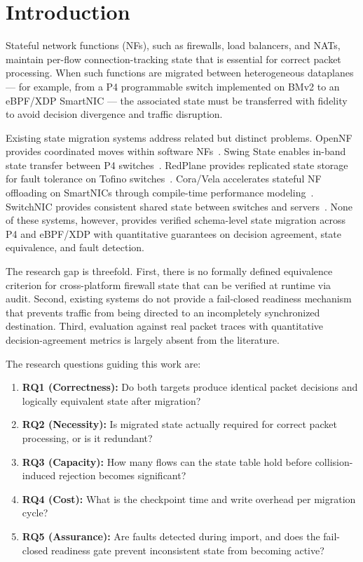 \documentclass[10pt, conference, compsoc]{IEEEtran}
\begin{document}
\section{Introduction}
\label{sec:introduction}

Stateful network functions (NFs), such as firewalls, load balancers, and NATs,
maintain per-flow connection-tracking state that is essential for correct packet
processing. When such functions are migrated between heterogeneous dataplanes
--- for example, from a P4 programmable switch implemented on BMv2 to an
eBPF/XDP SmartNIC --- the associated state must be transferred with fidelity to
avoid decision divergence and traffic disruption.

Existing state migration systems address related but distinct problems. OpenNF
provides coordinated moves within software NFs~\cite{gember2014opennf}.
Swing State enables in-band state transfer between P4 switches~\cite{luo2017swing}.
RedPlane provides replicated state storage for fault tolerance on Tofino
switches~\cite{kim2021redplane}. Cora/Vela accelerates stateful NF offloading on
SmartNICs through compile-time performance modeling~\cite{xi2024cora}. SwitchNIC
provides consistent shared state between switches and servers~\cite{lei2025switchnic}.
None of these systems, however, provides verified schema-level state migration
across P4 and eBPF/XDP with quantitative guarantees on decision agreement,
state equivalence, and fault detection.

The research gap is threefold. First, there is no formally defined equivalence
criterion for cross-platform firewall state that can be verified at runtime via audit.
Second, existing systems do not provide a fail-closed readiness mechanism that
prevents traffic from being directed to an incompletely synchronized destination.
Third, evaluation against real packet traces with quantitative decision-agreement
metrics is largely absent from the literature.

The research questions guiding this work are:

\begin{enumerate}
    \item \textbf{RQ1 (Correctness):} Do both targets produce identical packet
          decisions and logically equivalent state after migration?
    \item \textbf{RQ2 (Necessity):} Is migrated state actually required for
          correct packet processing, or is it redundant?
    \item \textbf{RQ3 (Capacity):} How many flows can the state table hold
          before collision-induced rejection becomes significant?
    \item \textbf{RQ4 (Cost):} What is the checkpoint time and write overhead
          per migration cycle?
    \item \textbf{RQ5 (Assurance):} Are faults detected during import, and
          does the fail-closed readiness gate prevent inconsistent state from
          becoming active?
\end{enumerate}
\end{document}
